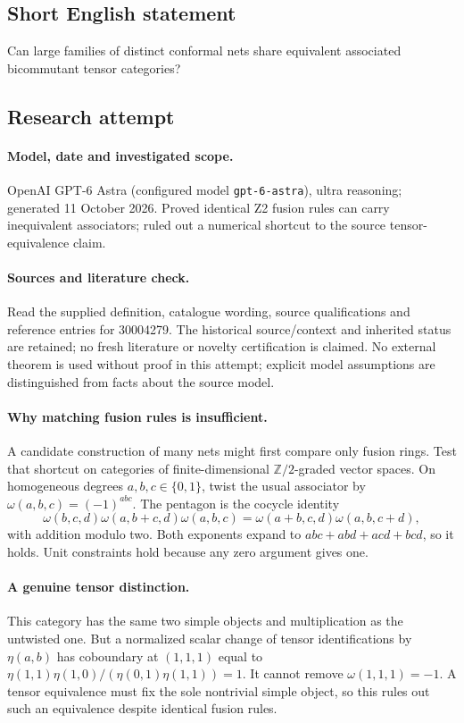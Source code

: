 \documentclass[11pt]{article}
\begin{document}
\subsection{Short English statement}
Can large families of distinct conformal nets share equivalent associated bicommutant tensor categories?
\subsection{Research attempt}
\paragraph{Model, date and investigated scope.}
OpenAI GPT-6 Astra (configured model \texttt{gpt-6-astra}), ultra reasoning; generated 11 October 2026. Proved identical Z2 fusion rules can carry inequivalent associators; ruled out a numerical shortcut to the source tensor-equivalence claim.

\paragraph{Sources and literature check.}
Read the supplied definition, catalogue wording, source qualifications and reference entries for 30004279. The historical source/context and inherited status are retained; no fresh literature or novelty certification is claimed. No external theorem is used without proof in this attempt; explicit model assumptions are distinguished from facts about the source model.

\paragraph{Why matching fusion rules is insufficient.} A candidate construction of many nets might first compare only fusion rings. Test that shortcut on categories of finite-dimensional \(\mathbb Z/2\)-graded vector spaces. On homogeneous degrees \(a,b,c\in\{0,1\}\), twist the usual associator by \(\omega(a,b,c)=(-1)^{abc}\). The pentagon is the cocycle identity
\[
 \omega(b,c,d)\omega(a,b+c,d)\omega(a,b,c)
 =\omega(a+b,c,d)\omega(a,b,c+d),
\]
with addition modulo two. Both exponents expand to \(abc+abd+acd+bcd\), so it holds. Unit constraints hold because any zero argument gives one.
\paragraph{A genuine tensor distinction.} This category has the same two simple objects and multiplication as the untwisted one. But a normalized scalar change of tensor identifications by \(\eta(a,b)\) has coboundary at \((1,1,1)\) equal to \(\eta(1,1)\eta(1,0)/(\eta(0,1)\eta(1,1))=1\). It cannot remove \(\omega(1,1,1)=-1\). A tensor equivalence must fix the sole nontrivial simple object, so this rules out such an equivalence despite identical fusion rules.
\end{document}

